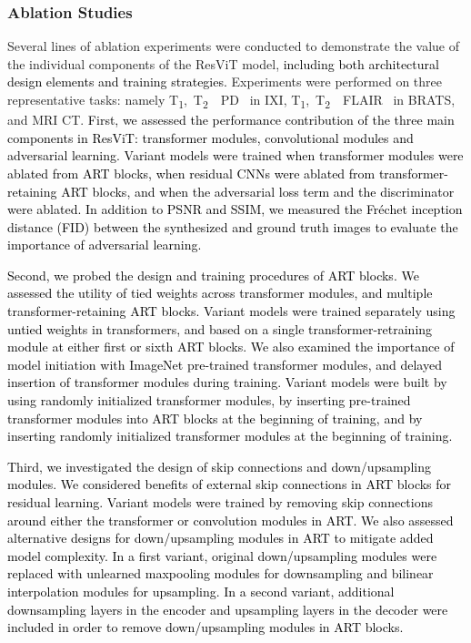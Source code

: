 \documentclass[journal,twoside,web]{ieeecolor}
\newcommand{\ToneTtwoPD}{T\textsubscript{1},~T\textsubscript{2}~~PD}
\newcommand{\ToneTtwoFlair}{T\textsubscript{1},~T\textsubscript{2}~~FLAIR}
\newcommand*{\revhl}{\textcolor{black}}
\begin{document}
\subsubsection{Ablation Studies}
Several lines of ablation experiments were conducted to demonstrate the value of the individual components of the ResViT model, \revhl{including both architectural design elements and training strategies.} Experiments were performed on three representative tasks: namely \ToneTtwoPD~ in IXI, \ToneTtwoFlair~ in BRATS, and MRI  CT. \revhl{First, we assessed the performance contribution of the three main components in ResViT: transformer modules, convolutional modules and adversarial learning. Variant models were trained when transformer modules were ablated from ART blocks, when residual CNNs were ablated from transformer-retaining ART blocks, and when the adversarial loss term and the discriminator were ablated. In addition to PSNR and SSIM, we measured the Fréchet inception distance (FID) \cite{fid} between the synthesized and ground truth images to evaluate the importance of adversarial learning.}
\par
\revhl{Second, we probed the design and training procedures of ART blocks. We assessed the utility of tied weights across transformer modules, and multiple transformer-retaining ART blocks. Variant models were trained separately using untied weights in transformers, and based on a single transformer-retraining module at either first or sixth ART blocks. We also examined the importance of model initiation with ImageNet pre-trained transformer modules, and delayed insertion of transformer modules during training. Variant models were built by using randomly initialized transformer modules, by inserting pre-trained transformer modules into ART blocks at the beginning of training, and by inserting randomly initialized transformer modules at the beginning of training.} 
\par
\revhl{Third, we investigated the design of skip connections and down/upsampling modules. We considered benefits of external skip connections in ART blocks for residual learning. Variant models were trained by removing skip connections around either the transformer or convolution modules in ART. We also assessed alternative designs for down/upsampling modules in ART to mitigate added model complexity. In a first variant, original down/upsampling modules were replaced with unlearned maxpooling modules for downsampling and bilinear interpolation modules for upsampling. In a second variant, additional downsampling layers in the encoder and upsampling layers in the decoder were included in order to remove down/upsampling modules in ART blocks.}
  \par
  
\end{document}
